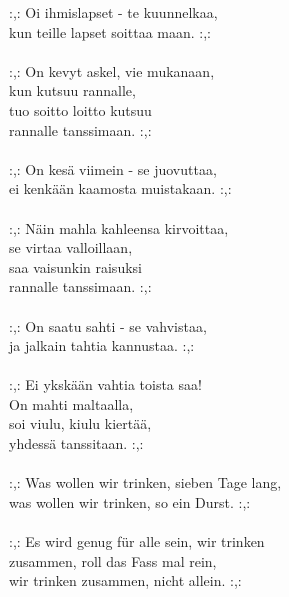 
:,: Oi ihmislapset - te kuunnelkaa, \\ kun teille lapset soittaa maan. :,: \\ \hspace{10mm} \\ :,: On kevyt askel, vie mukanaan, \\ kun kutsuu rannalle, \\ tuo soitto loitto kutsuu \\ rannalle tanssimaan. :,: \\ \hspace{10mm} \\ :,: On kesä viimein - se juovuttaa, \\ ei kenkään kaamosta muistakaan. :,: \\ \hspace{10mm} \\ :,: Näin mahla kahleensa kirvoittaa, \\ se virtaa valloillaan, \\ saa vaisunkin raisuksi \\ rannalle tanssimaan. :,: \\ \hspace{10mm} \\ :,: On saatu sahti - se vahvistaa, \\ ja jalkain tahtia kannustaa. :,: \\ \hspace{10mm} \\ :,: Ei ykskään vahtia toista saa! \\ On mahti maltaalla, \\ soi viulu, kiulu kiertää, \\ yhdessä tanssitaan. :,: \\ \hspace{10mm} \\ :,: Was wollen wir trinken, sieben Tage lang, \\ was wollen wir trinken, so ein Durst. :,:
\\ \hspace{10mm} 
\\ :,: Es wird genug für alle sein, wir trinken \\ zusammen, roll das Fass mal rein, \\ wir trinken zusammen, nicht allein. :,:
